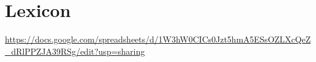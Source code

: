 \section{Lexicon}
\url{https://docs.google.com/spreadsheets/d/1W3hW0CICs0Jzt5hmA5ESsOZLXcQeZ_dRlPPZJA39RSg/edit?usp=sharing}

\begin{multicols}{2}
  \begin{hangparas}{1em}{1}

    

  \end{hangparas}
\end{multicols}
